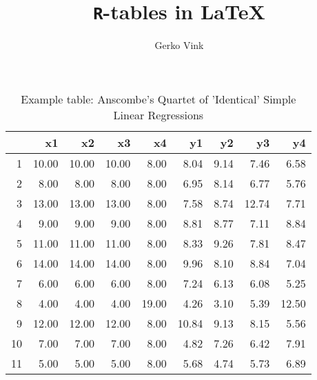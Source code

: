 \documentclass[10pt, fullpage, a4paper, titlepage]{article}
\title{\texttt{R}-tables in \LaTeX}
\author{Gerko Vink}
\begin{document}
\maketitle
\newpage

\begin{table}[ht]
\centering
\begin{tabular}{rrrrrrrrr}
  \hline
 & x1 & x2 & x3 & x4 & y1 & y2 & y3 & y4 \\ 
  \hline
1 & 10.00 & 10.00 & 10.00 & 8.00 & 8.04 & 9.14 & 7.46 & 6.58 \\ 
  2 & 8.00 & 8.00 & 8.00 & 8.00 & 6.95 & 8.14 & 6.77 & 5.76 \\ 
  3 & 13.00 & 13.00 & 13.00 & 8.00 & 7.58 & 8.74 & 12.74 & 7.71 \\ 
  4 & 9.00 & 9.00 & 9.00 & 8.00 & 8.81 & 8.77 & 7.11 & 8.84 \\ 
  5 & 11.00 & 11.00 & 11.00 & 8.00 & 8.33 & 9.26 & 7.81 & 8.47 \\ 
  6 & 14.00 & 14.00 & 14.00 & 8.00 & 9.96 & 8.10 & 8.84 & 7.04 \\ 
  7 & 6.00 & 6.00 & 6.00 & 8.00 & 7.24 & 6.13 & 6.08 & 5.25 \\ 
  8 & 4.00 & 4.00 & 4.00 & 19.00 & 4.26 & 3.10 & 5.39 & 12.50 \\ 
  9 & 12.00 & 12.00 & 12.00 & 8.00 & 10.84 & 9.13 & 8.15 & 5.56 \\ 
  10 & 7.00 & 7.00 & 7.00 & 8.00 & 4.82 & 7.26 & 6.42 & 7.91 \\ 
  11 & 5.00 & 5.00 & 5.00 & 8.00 & 5.68 & 4.74 & 5.73 & 6.89 \\ 
   \hline
\end{tabular}
\caption{Example table: Anscombe's Quartet of 'Identical' Simple Linear Regressions} 
\label{ACtable}
\end{table}
\end{document}

